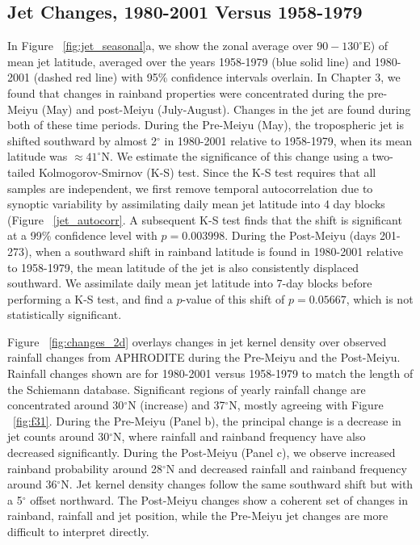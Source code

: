 \subsection{Jet Changes, 1980-2001 Versus 1958-1979}

	In Figure ~\ref{fig:jet_seasonal}a, we show the zonal average over $90-130^\circ$E) of mean jet latitude, averaged over the years 1958-1979 (blue solid line) and 1980-2001 (dashed red line) with 95\% confidence intervals overlain. In Chapter 3, we found that changes in rainband properties were concentrated during the pre-Meiyu (May) and post-Meiyu (July-August). Changes in the jet are found during both of these time periods. During the Pre-Meiyu (May), the tropospheric jet is shifted southward by almost 2$^{\circ}$ in 1980-2001 relative to 1958-1979, when its mean latitude was $\approx 41^{\circ}$N. We estimate the significance of this change using a two-tailed Kolmogorov-Smirnov (K-S) test. Since the K-S test requires that all samples are independent, we first remove temporal autocorrelation due to synoptic variability by assimilating daily mean jet latitude into 4 day blocks (Figure ~\ref{jet_autocorr}. A subsequent K-S test finds that the shift is significant at a 99\% confidence level with $p=0.003998$. During the Post-Meiyu (days 201-273), when a southward shift in rainband latitude is found in 1980-2001 relative to 1958-1979, the mean latitude of the jet is also consistently displaced southward. We assimilate daily mean jet latitude into 7-day blocks before performing a K-S test, and find a $p$-value of this shift of $p=0.05667$, which is not statistically significant.
	
	Figure ~\ref{fig:changes_2d} overlays changes in jet kernel density over observed rainfall changes from APHRODITE during the Pre-Meiyu and the Post-Meiyu. Rainfall changes shown are for 1980-2001 versus 1958-1979 to match the length of the Schiemann database. Significant regions of yearly rainfall change are concentrated around 30$^{\circ}$N (increase) and 37$^{\circ}$N, mostly agreeing with Figure ~\ref{fig:f31}. During the Pre-Meiyu (Panel b), the principal change is a decrease in jet counts around 30$^{\circ}$N, where rainfall and rainband frequency have also decreased significantly. During the Post-Meiyu (Panel c), we observe increased rainband probability around 28$^{\circ}$N and decreased rainfall and rainband frequency around 36$^{\circ}$N. Jet kernel density changes follow the same southward shift but with a 5$^{\circ}$ offset northward. The Post-Meiyu changes show a coherent set of changes in rainband, rainfall and jet position, while the Pre-Meiyu jet changes are more difficult to interpret directly.
	

